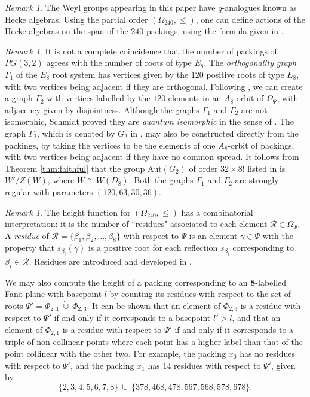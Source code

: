 \documentclass{amsart}
\theoremstyle{plain}
\theoremstyle{definition}
\theoremstyle{remark}
\newtheorem{rmk}[theorem]{Remark}
\numberwithin{equation}{section}
\newcommand{\be}{\beta}
\newcommand{\allroots}{\Phi}
\newcommand{\calr}{\mathcal{R}}
\newcommand{\eight}{{\mathbf 8}}
\newcommand{\qpx}{\Omega_{240}}
\newcommand{\qp}{\Omega}
\begin{document}
\begin{rmk}\label{rmk:hecke}
The Weyl groups appearing in this paper have $q$-analogues known as Hecke algebras. Using the partial 
order $(\qpx, \leq)$, one can define actions of the Hecke algebras on the span of the $240$ packings, using
the formula given in \cite[Theorem 7.1]{rains13}.
\end{rmk}

\begin{rmk}\label{rmk:schmidt}
It is not a complete coincidence that the number of packings of $PG(3, 2)$ agrees with the number of
roots of type $E_8$. The {\it orthogonality graph} $\Gamma_1$ of the $E_8$ root system has vertices given
by the $120$ positive roots of type $E_8$, with two vertices being adjacent if they are orthogonal.
Following \cite[\S6.3]{gx5}, we can create a graph $\Gamma_2$ with vertices labelled by the $120$ elements 
in an $A_8$-orbit of $\qp_\Psi$, with adjacency given by disjointness. Although the graphs $\Gamma_1$ and 
$\Gamma_2$ are not isomorphic, Schmidt \cite{schmidt24} proved they are {\it quantum isomorphic} in the 
sense of \cite{atserias19}. The graph $\Gamma_2$, which is denoted by $G_2$ in 
\cite[Table 2.2]{mathon97overlarge}, may also be constructed directly from the packings, by taking
the vertices to be the elements of one $A_8$-orbit of packings, with two vertices being adjacent if they
have no common spread. It follows from Theorem \ref{thm:faithful} that the group $\text{Aut}(G_2)$ of 
order $32 \times 8!$ listed in \cite[Table 2.2]{mathon97overlarge} is $W'/Z(W)$, where $W \cong W(D_8)$.
Both the graphs $\Gamma_1$ and $\Gamma_2$ are strongly regular with parameters $(120, 63, 30, 36)$.
\end{rmk}

\begin{rmk}\label{rmk:residues}
The height function for $(\qpx, \leq)$ has a combinatorial interpretation: it is the number of ``residues"
associated to each element $\calr \in \qp_\Psi$. A {\it residue} of $\calr = \{\be_1, \be_2, \ldots, \be_8\}$
with respect to $\Psi$ is an element $\gamma \in \Psi$ with the property that $s_{\be_i}(\gamma)$ is a positive root 
for each reflection $s_{\be_i}$ corresponding to $\be_i \in \calr$. Residues are introduced and developed 
in \cite{gx6}.

We may also compute the height of a packing corresponding to an $\eight$-labelled Fano plane with basepoint $l$ 
by counting its residues with respect to the set of roots $\Psi' = \allroots_{2, 1} \ \dot\cup \ \allroots_{2, 3}$. It 
can be shown that an element of $\allroots_{2, 3}$ is a residue with respect to $\Psi'$ if and only if it corresponds 
to a basepoint $l' > l$, and that an element of $\allroots_{2, 1}$ is a residue with respect to $\Psi'$ if and only 
if it corresponds to a triple of non-collinear points where each point has a higher label than that of the point 
collinear with the other two. For example, the packing $x_0$ has no residues with respect to $\Psi'$, and the packing 
$x_1$ has $14$ residues with respect to $\Psi'$, given by $$
\{2, 3, 4, 5, 6, 7, 8\} \ \cup \ \{378, 468, 478, 567, 568, 578, 678\}
.$$
\end{rmk}
\end{document}
